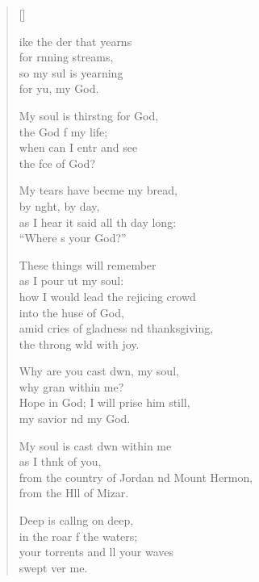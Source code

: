 \settowidth{\versewidth}{From the country of Jordan and Mount Hermon}
\begin{verse}[\versewidth]
  \begin{patverse}
ike the der that yearns\Med\\
for rnning streams,\\
so my sul is yearning\Med\\
for yu, my God.

My soul is thirst\pointup{\i}ng for God,\Med\\
the God f my life;\\
when can I entr and see\Med\\
the fce of God?

My tears have becme my bread,\Med\\
by n\pointup{\i}ght, by day,\\
as I hear it said all th day long:\Med\\
“Where \pointup{\i}s your God?”

These things will  remember\Med\\
as I pour ut my soul:\\
how I would lead the rejicing crowd\Med\\
into the huse of God,\\
amid cries of gladness nd thanksgiving,\Med\\
the throng w\pointup{\i}ld with joy.

Why are you cast dwn, my soul,\Med\\
why gran within me?\\
Hope in God; I will prise him still,\Med\\
my savior nd my God.

My soul is cast dwn within me\Med\\
as I th\pointup{\i}nk of you,\\
from the country of Jordan nd Mount Hermon,\Med\\
from the H\pointup{\i}ll of Mizar.

Deep is call\pointup{\i}ng on deep,\Med\\
in the roar f the waters;\\
your torrents and ll your waves\Med\\
swept ver me.


\end{patverse}
\end{verse}
